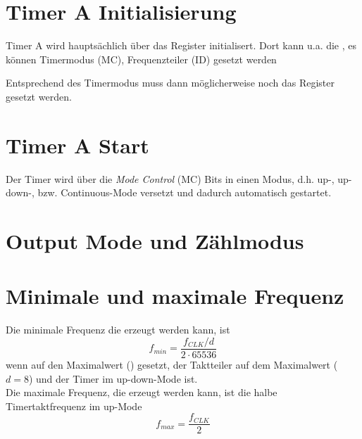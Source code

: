 \documentclass[a4paper, 12pt]{article}
\begin{document}
  
  \clearpage
  \setcounter{page}{1}
  \section{Timer A Initialisierung}
  Timer A wird hauptsächlich über das  Register initialisert.
  Dort kann u.a. die , es können Timermodus (MC), Frequenzteiler (ID) gesetzt werden

  Entsprechend des Timermodus muss dann möglicherweise noch das  Register
  gesetzt werden.
  
  \section{Timer A Start}
  Der Timer wird über die \emph{Mode Control} (MC) Bits in einen Modus, d.h.
  up-, up-down-, bzw. Continuous-Mode versetzt und dadurch automatisch gestartet.  

  \section{Output Mode und Zählmodus}

  \section{Minimale und maximale Frequenz}
  Die minimale Frequenz die erzeugt werden kann, ist
  \[f_{min} = \frac{f_{CLK}/d}{2\cdot 65536}\]
  wenn  auf den
  Maximalwert () gesetzt, der Taktteiler auf dem Maximalwert
  ($d=8$) und der Timer im up-down-Mode ist.\\

  Die maximale Frequenz, die erzeugt werden kann, ist die halbe
  Timertaktfrequenz im up-Mode
  \[f_{max} = \frac{f_{CLK}}{2}\]
  


 
\end{document}
